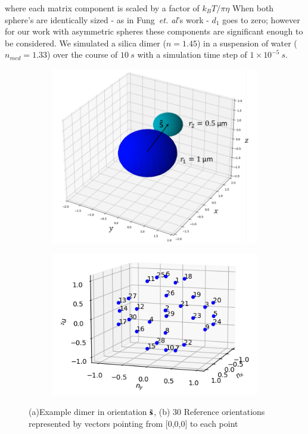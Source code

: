 \documentclass[final,  3p]{elsarticle}
\begin{document}
where each matrix component is scaled by a factor of $k_B T/\pi \eta$ When both sphere's are identically sized - as in Fung~\textit{et. al}'s work - $d_1$ goes to zero; however for our work with asymmetric spheres these components are significant enough to be considered. We simulated a silica dimer ($n = 1.45$) in a suspension of water ($n_{med} = 1.33$) over the course of $10 \ s$ with a simulation time step of $1 \times 10^{-5} \ s$.

\begin{figure}[h]
	\centering
	\begin{subfigure}{0.49\textwidth}
		\subcaption{}
		\includegraphics[width=\textwidth]{./Images/fig2a.png}
	\end{subfigure}
	\begin{subfigure}{0.49\textwidth}
		\subcaption{}
		\includegraphics[width=\textwidth]{./Images/fig2b.png}
	\end{subfigure}
	\caption{(a)Example dimer in orientation $\bar{\bf s}$, (b) 30 Reference orientations represented by vectors pointing from [0,0,0] to each point}
	\label{fig:dimer}
\end{figure}
\end{document}
